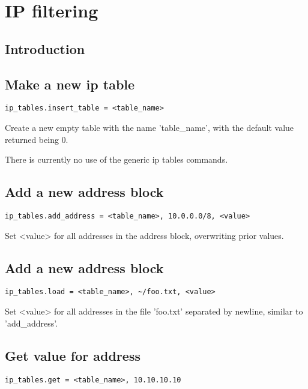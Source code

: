 \section{IP filtering}

\subsection{Introduction}

\subsection{Make a new ip table}

\begin{verbatim}
ip_tables.insert_table = <table_name>
\end{verbatim}

Create a new empty table with the name 'table\_name', with the default
value returned being $0$.

There is currently no use of the generic ip tables commands.


\subsection{Add a new address block}

\begin{verbatim}
ip_tables.add_address = <table_name>, 10.0.0.0/8, <value>
\end{verbatim}

Set <value> for all addresses in the address block, overwriting prior
values.


\subsection{Add a new address block}

\begin{verbatim}
ip_tables.load = <table_name>, ~/foo.txt, <value>
\end{verbatim}

Set <value> for all addresses in the file 'foo.txt' separated by
newline, similar to 'add\_address'.


\subsection{Get value for address}

\begin{verbatim}
ip_tables.get = <table_name>, 10.10.10.10
\end{verbatim}

